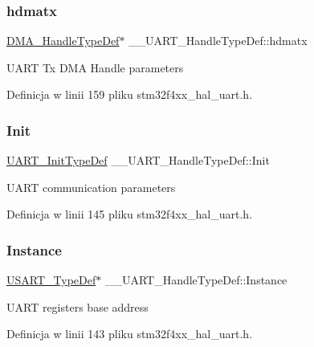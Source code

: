 \subsubsection{\texorpdfstring{hdmatx}{hdmatx}}
{\footnotesize\ttfamily \hyperlink{group___d_m_a___exported___types_ga41b754a906b86bce54dc79938970138b}{D\+M\+A\+\_\+\+Handle\+Type\+Def}$\ast$ \+\_\+\+\_\+\+U\+A\+R\+T\+\_\+\+Handle\+Type\+Def\+::hdmatx}

U\+A\+RT Tx D\+MA Handle parameters 

Definicja w linii 159 pliku stm32f4xx\+\_\+hal\+\_\+uart.\+h.

\mbox{\label{struct_____u_a_r_t___handle_type_def_a56ed519d3ec77350c528fb8536bd9f5a}} 
\subsubsection{\texorpdfstring{Init}{Init}}
{\footnotesize\ttfamily \hyperlink{struct_u_a_r_t___init_type_def}{U\+A\+R\+T\+\_\+\+Init\+Type\+Def} \+\_\+\+\_\+\+U\+A\+R\+T\+\_\+\+Handle\+Type\+Def\+::\+Init}

U\+A\+RT communication parameters 

Definicja w linii 145 pliku stm32f4xx\+\_\+hal\+\_\+uart.\+h.

\mbox{\label{struct_____u_a_r_t___handle_type_def_aadd8a626e4d5dd937ee1b6461365831a}} 
\subsubsection{\texorpdfstring{Instance}{Instance}}
{\footnotesize\ttfamily \hyperlink{struct_u_s_a_r_t___type_def}{U\+S\+A\+R\+T\+\_\+\+Type\+Def}$\ast$ \+\_\+\+\_\+\+U\+A\+R\+T\+\_\+\+Handle\+Type\+Def\+::\+Instance}

U\+A\+RT registers base address 

Definicja w linii 143 pliku stm32f4xx\+\_\+hal\+\_\+uart.\+h.


